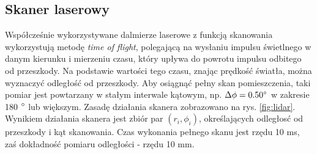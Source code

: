\subsection{Skaner laserowy}
Współcześnie wykorzystywane dalmierze laserowe z funkcją skanowania wykorzystują metodę \textit{time of flight}, polegającą na wysłaniu impulsu świetlnego w danym kierunku i mierzeniu czasu, który upływa do powrotu impulsu odbitego od przeszkody. Na podstawie wartości tego czasu, znając prędkość światła, można wyznaczyć odległość od przeszkody. Aby osiągnąć pełny skan pomieszczenia, taki pomiar jest powtarzany w stałym interwale kątowym, np. $\Delta \phi = 0.50 \degree$ w zakresie 180 $\degree$ lub większym. Zasadę działania skanera zobrazowano na rys. \ref{fig:lidar}. Wynikiem działania skanera jest zbiór par $(r_i, \phi_i)$, określających odległosć od przeszkody i kąt skanowania. Czas wykonania pełnego skanu jest rzędu 10 ms, zaś dokładność pomiaru odległości - rzędu 10 mm.

